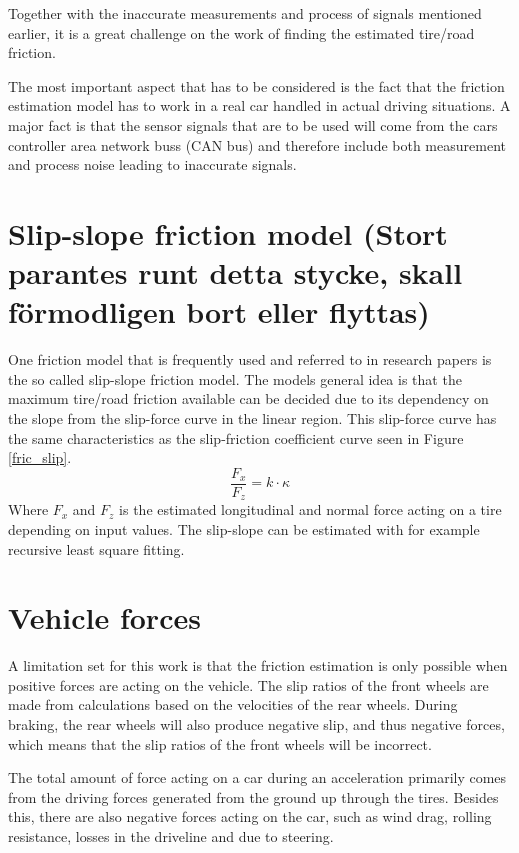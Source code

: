 Together with the inaccurate measurements and process of signals mentioned earlier, it is a great challenge on the work of finding the estimated tire/road friction.  

The most important aspect that has to be considered is the fact that the friction estimation model has to work in a real car handled in actual driving situations. A major fact is that the sensor signals that are to be used  will come from the cars controller area network buss (CAN bus) and therefore include both measurement and process noise leading to inaccurate signals. 

\section{Slip-slope friction model (Stort parantes runt detta stycke, skall förmodligen bort eller flyttas)}

One friction model that is frequently used and referred to in research papers is the so called slip-slope friction model. The models general idea is that the maximum tire/road friction available can be decided due to its dependency on the slope from the slip-force curve in the linear region. This slip-force curve has the same characteristics as the slip-friction coefficient curve seen in Figure \ref{fric_slip}. 
\begin{equation}
\dfrac{F_{x}}{F_{z}} = k \cdot \kappa
\end{equation}
Where $ F_{x} $ and $ F_{z} $ is the estimated longitudinal and normal force acting on a tire depending on input values. The slip-slope can be estimated with for example recursive least square fitting.

\section{Vehicle forces}

A limitation set for this work is that the friction estimation is only possible when positive forces are acting on the vehicle. The slip ratios of the front wheels are made from calculations based on the velocities of the rear wheels. During braking, the rear wheels will also produce negative slip, and thus negative forces, which means that the slip ratios of the front wheels will be incorrect. 

The total amount of force acting on a car during an acceleration primarily comes from the driving forces generated from the ground up through the tires. Besides this, there are also negative forces acting on the car, such as wind drag, rolling resistance, losses in the driveline and due to steering. 

